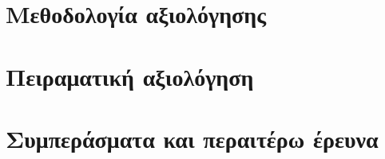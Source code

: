 \section{Μεθοδολογία αξιολόγησης}
  \label{section:02_01_03}
  

\section{Πειραματική αξιολόγηση}
  \label{section:02_01_04}
  

\section{Συμπεράσματα και περαιτέρω έρευνα}
  \label{section:02_01_05}
  
